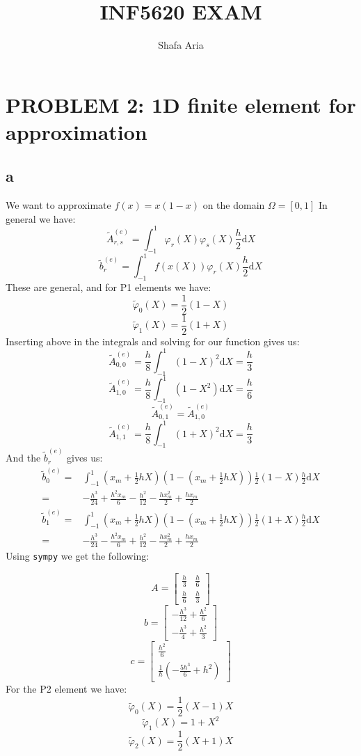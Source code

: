 \documentclass{article}
\begin{document}
\title{INF5620 EXAM}
\author{Shafa Aria}
\maketitle
\section{PROBLEM 2: 1D finite element for approximation}
\subsection{a}
We want to approximate $f(x) = x(1-x)$ on the domain $\Omega = [0,1]$
In general we have:
$$\tilde A_{r,s}^{(e)} = \int_{-1}^{1} \varphi_r(X) \varphi_s(X)\frac{h}{2}\mathrm{d}X$$
$$\tilde b_{r}^{(e)} = \int_{-1}^{1} f(x(X))\varphi_r(X)\frac{h}{2}\mathrm{d}X$$
These are general, and for P1 elements we have:
$$\tilde \varphi_0(X) = \frac{1}{2}(1-X)$$
$$\tilde \varphi_1(X) = \frac{1}{2}(1+X)$$
Inserting above in the integrals and solving for our function gives us:
$$\tilde A_{0,0}^{(e)} = \frac{h}{8} \int_{-1}^{1} (1-X)^2\mathrm{d}X = \frac{h}{3}$$
$$\tilde A_{1,0}^{(e)} = \frac{h}{8} \int_{-1}^{1} (1-X^2)\mathrm{d}X = \frac{h}{6}$$
$$\tilde A_{0,1}^{(e)} = \tilde A_{1,0}^{(e)} $$
$$\tilde A_{1,1}^{(e)} = \frac{h}{8} \int_{-1}^{1} (1+X)^2\mathrm{d}X = \frac{h}{3}$$
And the $\tilde b_{r}^{(e)}$ gives us:
\begin{align*} 
\tilde b_{0}^{(e)} = &\int_{-1}^{1} (x_m +\frac{1}{2}hX)(1 - (x_m +\frac{1}{2}hX))\frac{1}{2}(1-X)\frac{h}{2}\mathrm{d}X\\
=& - \frac{h^{3}}{24} + \frac{h^{2} x_{m}}{6} - \frac{h^{2}}{12} - \frac{h x_{m}^{2}}{2} + \frac{h x_{m}}{2}\\
\tilde b_{1}^{(e)} = &\int_{-1}^{1} (x_m +\frac{1}{2}hX)(1 - (x_m +\frac{1}{2}hX))\frac{1}{2}(1+X)\frac{h}{2}\mathrm{d}X\\
=& - \frac{h^{3}}{24} - \frac{h^{2} x_{m}}{6} + \frac{h^{2}}{12} - \frac{h x_{m}^{2}}{2} + \frac{h x_{m}}{2}
\end{align*}
Using \texttt{sympy} we get the following:

$$A = \left[\begin{matrix}\frac{h}{3} & \frac{h}{6}\\\frac{h}{6} & \frac{h}{3}\end{matrix}\right]$$
$$b = \left[\begin{matrix}- \frac{h^{3}}{12} + \frac{h^{2}}{6}\\- \frac{h^{3}}{4} + \frac{h^{2}}{3}\end{matrix}\right]$$
$$c = \left[\begin{matrix}\frac{h^{2}}{6}\\\frac{1}{h} \left(- \frac{5 h^{3}}{6} + h^{2}\right)\end{matrix}\right]
$$
For the P2 element we have:
$$\tilde \varphi_0(X) = \frac{1}{2}(X-1)X$$
$$\tilde \varphi_1(X) = 1+X^2$$
$$\tilde \varphi_2(X) = \frac{1}{2}(X+1)X$$
\end{document}
